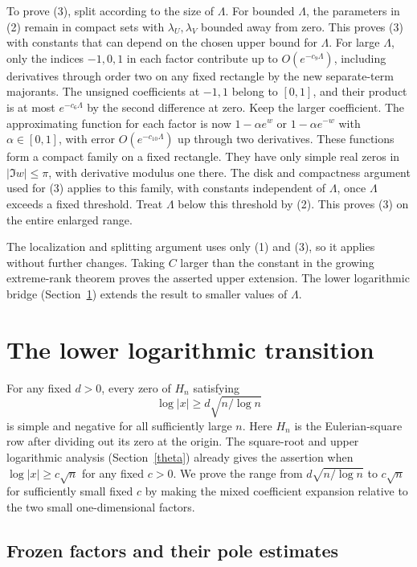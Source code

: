 \documentclass[11pt]{article}
\begin{document}
To prove (3), split according to the size of $\Lambda$. For bounded $\Lambda$, the parameters in (2) remain in compact sets with $\lambda_U,\lambda_V$ bounded away from zero. This proves (3) with constants that can depend on the chosen upper bound for $\Lambda$. For large $\Lambda$, only the indices $-1,0,1$ in each factor contribute up to $O(e^{-c_9\Lambda})$, including derivatives through order two on any fixed rectangle by the new separate-term majorants. The unsigned coefficients at $-1,1$ belong to $[0,1]$, and their product is at most $e^{-c_6\Lambda}$ by the second difference at zero. Keep the larger coefficient. The approximating function for each factor is now $1-\alpha e^{w}$ or $1-\alpha e^{-w}$ with $\alpha\in[0,1]$, with error $O(e^{-c_{10}\Lambda})$ up through two derivatives. These functions form a compact family on a fixed rectangle. They have only simple real zeros in $|\Im w|\le\pi$, with derivative modulus one there. The disk and compactness argument used for (3) applies to this family, with constants independent of $\Lambda$, once $\Lambda$ exceeds a fixed threshold. Treat $\Lambda$ below this threshold by (2). This proves (3) on the entire enlarged range.

The localization and splitting argument uses only (1) and (3), so it applies without further changes. Taking $C$ larger than the constant in the growing extreme-rank theorem proves the asserted upper extension. The lower logarithmic bridge (Section~\ref{bridge}) extends the result to smaller values of $\Lambda$.
\section{The lower logarithmic transition}\label{bridge}
For any fixed $d>0$, every zero of $H_n$ satisfying
\[
 \log|x|\ge d\sqrt{n/\log n}
\]
is simple and negative for all sufficiently large $n$. Here $H_n$ is the Eulerian-square row after dividing out its zero at the origin. The square-root and upper logarithmic analysis (Section~\ref{theta}) already gives the assertion when $\log |x|\ge c\sqrt n$ for any fixed $c>0$. We prove the range from $d\sqrt{n/\log n}$ to $c\sqrt n$ for sufficiently small fixed $c$ by making the mixed coefficient expansion relative to the two small one-dimensional factors.

\subsection{Frozen factors and their pole estimates}
\end{document}
